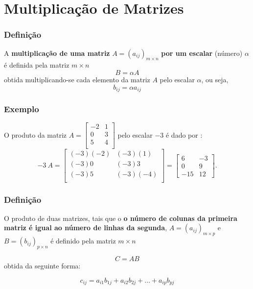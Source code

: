 \documentclass{article}
\begin{document}
 \section{Multiplicação de Matrizes}
\subsubsection{Definição}
 A \textbf{multiplicação de uma matriz} $A = (a_{ij})_{m \times n}$ \textbf{por um escalar} (número) $\alpha$ é definida pela matriz $m \times n$
 $$B = \alpha A$$
 obtida multiplicando-se cada elemento da matriz $A$ pelo escalar $\alpha $, ou seja,
 $$b_{ij} = \alpha a_{ij}$$

 \subsubsection{Exemplo}

 O produto da matriz $ A = 
 \begin{bmatrix}
    -2 & 1 \\
    0 & 3 \\
    5 & 4 \\
 \end{bmatrix}$
 pelo escalar $-3$ é dado por :
 $$-3\ A =  \begin{bmatrix}
    (-3)(-2) & (-3)(1) \\
    (-3)0 & (-3)3 \\
    (-3)5 & (-3)(-4) \\
 \end{bmatrix}
 =
 \begin{bmatrix}
    6 & -3 \\
    0 & 9 \\
    -15 & 12
\end{bmatrix}
.
 $$

 \subsubsection{Definição}
 O produto de duas matrizes, tais que o \textbf{o número de colunas da primeira matriz é igual ao número de linhas da segunda},
 $ A = (a_{ij})_{m \times p}$ e $B = (b_{ij})_{p \times n}$ é definido pela matriz $m \times n$

$$C = AB$$
obtida da seguinte forma:

$$c_{ij} = a_{i1}b_{1j} + a_{i2}b_{2j} + \hdots + a_{ip}b_{pj}$$
\end{document}
